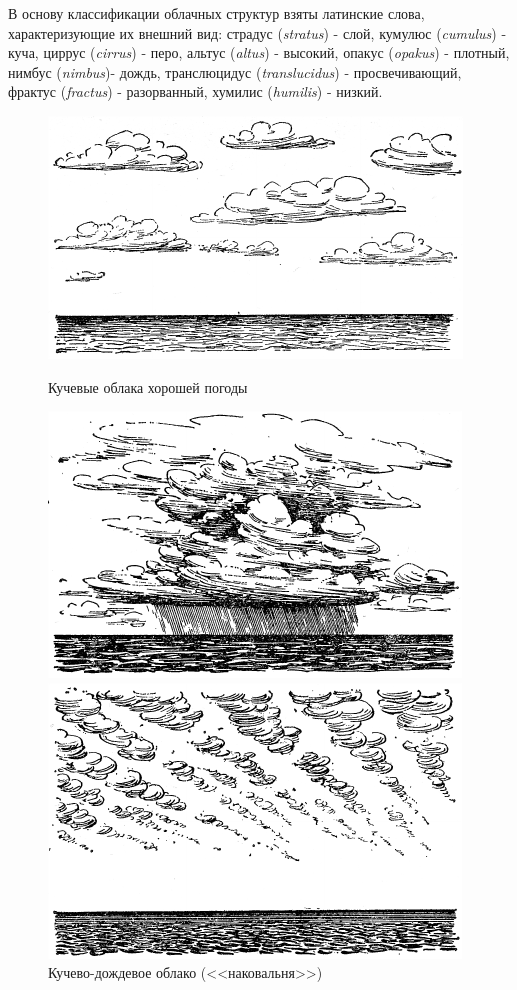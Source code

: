 \documentclass[a4paper, 12pt, twoside, final, book, russian, fittopage, cyremdash]{ncc}
\begin{document}
В основу классификации облачных структур взяты латинские слова, характеризующие их внешний вид: страдус (\textit{stratus}) - слой, кумулюс (\textit{cumulus}) - куча, циррус (\textit{cirrus}) - перо, альтус (\textit{altus}) - высокий, опакус (\textit{opakus}) - плотный, нимбус (\textit{nimbus})- дождь, транслюцидус (\textit{translucidus}) - просвечивающий, фрактус (\textit{fractus}) - разорванный, хумилис (\textit{humilis}) - низкий. 

\begin{figure}
  \begin{minipage}[b]{0.49\textwidth}
    \centering
    \includegraphics[scale=1.2]{0112P}
    \caption{Кучевые облака хорошей погоды}
    \label{fig:112}
  \end{minipage}
  \hfil\hfil
  \begin{minipage}[b]{0.49\textwidth}
    \centering
    \includegraphics[scale=1.2]{0113P}
    \caption{Кучево-дождевое облако (<<наковальня>>)}
    \label{fig:113}
  \end{minipage}
  \par
  \smallskip
  \begin{minipage}[b]{0.49\textwidth}
    \centering
    \includegraphics[scale=1.2]{0114P}

\end{minipage}
\end{figure}
\end{document}
